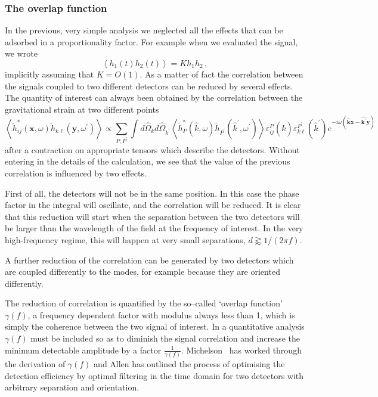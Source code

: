 \documentclass[11pt,a4paper]{article}
\begin{document}
\subsubsection{The overlap function}

In the previous, very simple analysis we neglected all the effects that can be adsorbed in a proportionality factor.  For example when we evaluated the signal, we wrote
\begin{equation}
\left<h_1(t) h_2(t)\right> = K h_1 h_2 \,,
\end{equation}
implicitly assuming that $K=O(1)$. As a matter of fact the correlation between the signals coupled to two different detectors can be reduced by several effects.
The quantity of interest can always been obtained by the correlation between the gravitational strain at two different points
\begin{equation}
\left<\tilde{h}_{ij}^*(\boldsymbol{x},\omega) \tilde{h}_{k\ell}(\boldsymbol{y},\omega^\prime)\right> \propto
\sum_{P,P^\prime} \int d\hat{\Omega}_k d\hat{\Omega}_{k^\prime} \left<\tilde{h}_P^*(\hat{k},\omega)\tilde{h}_{P^\prime}(\hat{k}^\prime,\omega^\prime) \right> \varepsilon_{ij}^P(\hat{k}) \varepsilon_{k\ell}^{P^\prime}(\hat{k}^\prime)
e^{-i\omega(\hat{\boldsymbol{k}}\boldsymbol{x}-\hat{\boldsymbol{k}^\prime}\boldsymbol{y})}
\end{equation}
after a contraction on appropriate tensors which describe the detectors. Without entering in the details of the calculation, we see that the value of the previous correlation is influenced by two effects.

First of all, the detectors will not be in the same position. In this case the phase factor in the integral will oscillate, and the correlation will be reduced. It is clear that this reduction will start when the separation between the two detectors will be larger than the wavelength of the field at the frequency of interest.  In the very high-frequency regime, this will happen at very small separations, $d \gtrapprox 1/(2\pi f)$.

A further reduction of the correlation can be generated by two detectors which are coupled differently to the modes, for example because they are oriented differently.

The reduction of correlation is quantified by the so--called `overlap function' $\gamma (f)$, a frequency dependent factor with modulus always less than 1, which is simply the coherence between the two signal of interest. In a quantitative analysis $\gamma(f)$ must be included so as to diminish the signal correlation and increase the minimum detectable amplitude by a factor $\frac{1}{\gamma(f)}$. Michelson~\cite{Michelson} has worked through the derivation of $\gamma(f)$ and Allen \cite{Allen} has outlined the process of optimising the detection efficiency by optimal filtering in the time domain for two detectors with arbitrary separation and orientation.
\end{document}
